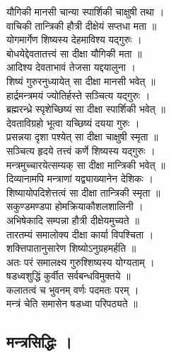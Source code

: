 यौगिकी मानसी चान्या स्पार्शिकी चाक्षुषी तथा ।\\[-2mm]
वाचिकी तान्त्रिकी हौत्री दीक्षेयं सप्तधा मता ॥\\
योगमार्गेण शिष्यस्य देहमाविश्य यद्गुरुः ।\\[-2mm]
बोधयेद्देवतातत्त्वं सा दीक्षा यौगिकी मता ॥\\
आदिश्य देवताभावं तेजसा यद्दयालुना ।\\[-2mm]
शिष्यं गुरुरनुध्यायेत् सा दीक्षा मानसी भवेत् ॥\\
हार्द्रमन्त्रमयं ज्योतिर्हस्ते सञ्चित्य यद्गुरुः ।\\[-2mm]
ब्रह्मरन्ध्रे स्पृशेच्छिष्यं सा दीक्षा स्पार्शिकी भवेत् ॥\\
देवताविग्रहो भूत्वा यच्छिष्यं दयया गुरुः ।\\[-2mm]
प्रसन्नया दृशा पश्येत् सा दीक्षा चाक्षुषी स्मृता ॥\\
सञ्चित्य हृदये तत्त्वं कर्णे शिष्यस्य यद्गुरुः ।\\[-2mm]
मन्त्रमुच्चारयेत्सम्यक् सा दीक्षा मान्त्रिकी भवेत् ॥\\
दिव्यानामपि मन्त्राणां यद्व्याख्यानेन देशिकः ।\\[-2mm]
शिष्यायोपदिशेत्तत्वं सा दीक्षा तान्त्रिकी स्मृता ॥\\
सकुण्डमण्डपा होमक्रियाकौशलशालिनी ।\\[-2mm]
अभिषेकादि सम्पन्ना हौत्री दीक्षेयमुच्यते ॥\\
तारतम्यं समालोक्य दीक्षा कार्या विपश्चिता ।\\[-2mm]
शक्त्तिपातानुसारेण शिष्योऽनुग्रहमर्हति ॥\\
अतः परं समालक्ष्य गुरुश्शिष्यस्य योग्यताम् ।\\[-2mm]
षडध्वशुद्धिं कुर्वीत सर्वबन्धविमुक्तये ॥\\
कलातत्वं च भुवनम् वर्णः पदमतः परम् ।\\[-2mm]
मन्त्रं चेति समासेन षडध्वा परिपठ्यते ॥\\

\subsection{मन्त्रसिद्धिः ।}

